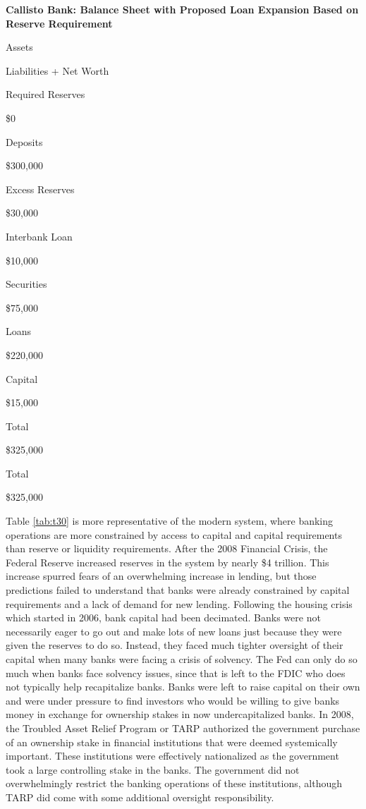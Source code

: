 \documentclass[
]{book}
\begin{document}
\label{tab:t29}\textbf{Callisto Bank: Balance Sheet with Proposed Loan Expansion Based on Reserve Requirement}

Assets

Liabilities + Net Worth

Required Reserves

\$0

Deposits

\$300,000

Excess Reserves

\$30,000

Interbank Loan

\$10,000

Securities

\$75,000

Loans

\$220,000

Capital

\$15,000

Total

\$325,000

Total

\$325,000

Table \ref{tab:t30} is more representative of the modern system, where banking operations are more constrained by access to capital and capital requirements than reserve or liquidity requirements. After the 2008 Financial Crisis, the Federal Reserve increased reserves in the system by nearly \$4 trillion. This increase spurred fears of an overwhelming increase in lending, but those predictions failed to understand that banks were already constrained by capital requirements and a lack of demand for new lending. Following the housing crisis which started in 2006, bank capital had been decimated. Banks were not necessarily eager to go out and make lots of new loans just because they were given the reserves to do so. Instead, they faced much tighter oversight of their capital when many banks were facing a crisis of solvency. The Fed can only do so much when banks face solvency issues, since that is left to the FDIC who does not typically help recapitalize banks. Banks were left to raise capital on their own and were under pressure to find investors who would be willing to give banks money in exchange for ownership stakes in now undercapitalized banks. In 2008, the Troubled Asset Relief Program or TARP authorized the government purchase of an ownership stake in financial institutions that were deemed systemically important. These institutions were effectively nationalized as the government took a large controlling stake in the banks. The government did not overwhelmingly restrict the banking operations of these institutions, although TARP did come with some additional oversight responsibility.
\end{document}
